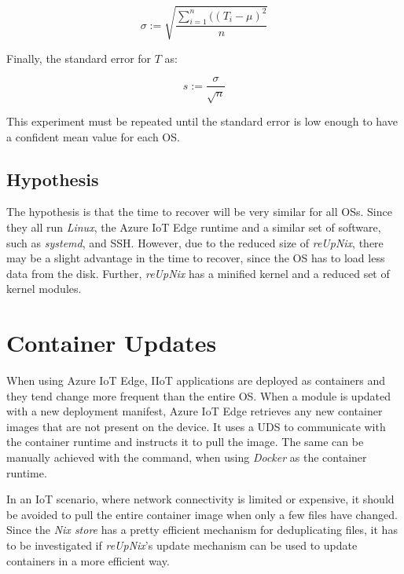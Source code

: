 \begin{equation}
   \sigma := \sqrt{\frac{\sum_{i=1}^{n}((T_i - \mu)^2}{n}}
\end{equation}

\noindent
Finally, the standard error for $T$ as:

\begin{equation}
    s := \frac{\sigma}{\sqrt{n}}
\end{equation}

\noindent
This experiment must be repeated until the standard error is low enough
to have a confident mean value for each \ac{OS}.

\subsection{Hypothesis}
The hypothesis is that the time to recover will be very similar for all
\ac{OS}s. Since they all run \textit{Linux}, the Azure IoT Edge runtime and
a similar set of software, such as \textit{systemd}, and \ac{SSH}. However, due
to the reduced size of \textit{reUpNix}, there may be a slight advantage in the
time to recover, since the \ac{OS} has to load less data from the disk. Further,
\textit{reUpNix} has a minified kernel and a reduced set of kernel modules.

\section{Container Updates}
\label{sec:container-updates}
When using Azure IoT Edge, \ac{IIoT} applications are deployed as containers and
they tend change more frequent than the entire \ac{OS}. When a module is updated
with a new deployment manifest, Azure IoT Edge retrieves any new container
images that are not present on the device. It uses a \ac{UDS} to communicate
with the container runtime and instructs it to pull the image. The same can be
manually achieved with the  command, when using \textit{Docker}
as the container runtime.

In an \ac{IoT} scenario, where network connectivity is limited or expensive,
it should be avoided to pull the entire container image when only a few files have
changed. Since the \textit{Nix store} has a pretty efficient mechanism for
deduplicating files, it has to be investigated if \textit{reUpNix}'s
update mechanism can be used to update containers in a more efficient way.

